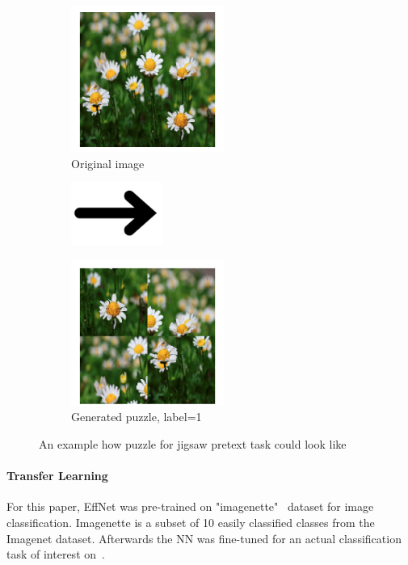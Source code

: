 \\
\begin{figure}[h]
    \begin{subfigure}{0.33\textwidth}
        \caption{Original image}
        \includegraphics[width=5cm]{images/dandelion}
    \end{subfigure}
    \begin{subfigure}{0.2\textwidth}
        \includegraphics[width=3cm]{images/arrow}
    \end{subfigure}
    \begin{subfigure}{0.33\textwidth}
        \caption{Generated puzzle, label=1}
        \includegraphics[width=5cm]{images/puzzle}
    \end{subfigure}
    \caption{An example how puzzle for jigsaw pretext task could look like}
    \label{fig:jig-fig}
\end{figure}


\paragraph{Transfer Learning}For this paper, EffNet was pre-trained on "imagenette"~\cite{ImageNette} dataset for image classification.
Imagenette is a subset of 10 easily classified classes from the Imagenet dataset.
Afterwards the NN was fine-tuned for an actual classification task of interest on~\cite{tfflowers}.

